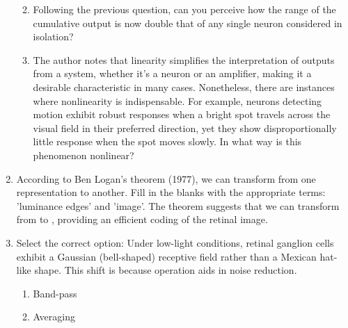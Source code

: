 \documentclass[11pt,letterpaper]{article}
\begin{document}
\begin{enumerate}
\begin{enumerate}
        \vspace{3 cm}
    
        \item Following the previous question, can you perceive how the range of the cumulative output is now double that of any single neuron considered in isolation?
    
        \vspace{1.5 cm}
    
        \item The author notes that linearity simplifies the interpretation of outputs from a system, whether it's a neuron or an amplifier, making it a desirable characteristic in many cases. Nonetheless, there are instances where nonlinearity is indispensable. For example, neurons detecting motion exhibit robust responses when a bright spot travels across the visual field in their preferred direction, yet they show disproportionally little response when the spot moves slowly. In what way is this phenomenon nonlinear?
    
        \vspace{3 cm}
    \end{enumerate}


    \item According to Ben Logan's theorem (1977), we can transform from one representation to another. Fill in the blanks with the appropriate terms: 'luminance edges' and 'image'. The theorem suggests that we can transform from \underline{\hspace{4 cm}} to \underline{\hspace{4 cm}}, providing an efficient coding of the retinal image.

    \item Select the correct option: Under low-light conditions, retinal ganglion cells exhibit a Gaussian (bell-shaped) receptive field rather than a Mexican hat-like shape. This shift is because \underline{\hspace{2 cm}} operation aids in noise reduction.
    \begin{enumerate}
        \item Band-pass
        \item Averaging
    \end{enumerate}
    


    

\end{enumerate}
\end{document}
